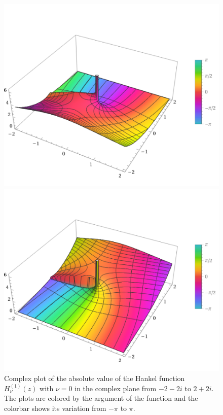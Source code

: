 \begin{figure}[H]
    \centering
    \begin{minipage}{.5\textwidth}
        \centering
        \includegraphics[width=\linewidth]{Images/Bessel/hankel_1_0_z.png}
        \captionsetup{width=0.9\linewidth} %
        \caption{Complex plot of the absolute value of the Hankel function \(H_\nu^{(1)}(z)\) with \(\nu=0\) in the complex plane from \(-2-2i\) to \(2+2i\). The plots are colored by the argument of the function and the colorbar shows its variation from \(-\pi\) to \(\pi\).}
        \label{hankel_function_1_complex_plot}
    \end{minipage}%
    \begin{minipage}{.5\textwidth}
        \centering
        \includegraphics[width=\linewidth]{Images/Bessel/hankel_2_0_z.png}

\end{minipage}
\end{figure}
